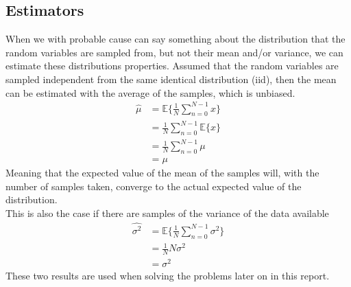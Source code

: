 \subsection{Estimators}
When we with probable cause can say something about the distribution that the random variables are sampled from, but not their mean and/or variance, we can estimate these distributions properties. Assumed that the random variables are sampled independent from the same identical distribution (iid), then the mean can be estimated with the average of the samples, which is unbiased.
\begin{align}
	\hat{\mu} & = \mathbb{E}\{\frac{1}{N}\sum_{n=0}^{N-1}x\}\nonumber\\
	& = \frac{1}{N}\sum_{n=0}^{N-1}\mathbb{E}\{x\}\nonumber\\
	& = \frac{1}{N}\sum_{n=0}^{N-1}\mu\nonumber\\
	& = \mu\label{eq:mu_est}
\end{align}
Meaning that the expected value of the mean of the samples will, with the number of samples taken, converge to the actual expected value of the distribution.\\
This is also the case if there are samples of the variance of the data available
\begin{align}
	\hat{\sigma^2} & = \mathbb{E}\{\frac{1}{N}\sum_{n=0}^{N-1}\sigma^2\}\nonumber\\
	& = \frac{1}{N}N\sigma^2\nonumber\\
	& = \sigma^2\label{eq:sigma_est}
\end{align}
These two results are used when solving the problems later on in this report.
